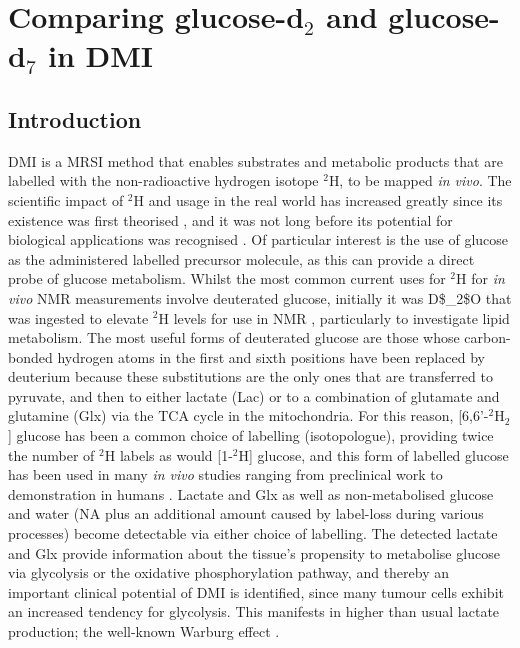\chapter{Comparing \texorpdfstring{glucose-d$_2$}{D2} and \texorpdfstring{glucose-d$_7$}{D7} in DMI}
\label{Chap:Glucose}

\section{Introduction}

\ac{DMI} is a \ac{MRSI} method that enables substrates and metabolic products that are labelled with the non-radioactive hydrogen isotope $^2$H, to be mapped \textit{in vivo}. The scientific impact of $^2$H and usage in the real world has increased greatly since its existence was first theorised \cite{Urey1932AConcentration}, and it was not long before its potential for biological applications was recognised \cite{Schoenheimer1935DeuteriumMetabolism, Schoenheimer1938TheMetabolism}. Of particular interest is the use of glucose as the administered labelled precursor molecule, as this can provide a direct probe of glucose metabolism. Whilst the most common current uses for $^2$H for \textit{in vivo} \ac{NMR} measurements involve deuterated glucose, initially it was \ac{D$_2$O} that was ingested to elevate $^2$H levels for use in \ac{NMR} \cite{Brereton1986PreliminarySpectroscopy, Irving1987InSpectroscopy}, particularly to investigate lipid metabolism. The most useful forms of deuterated glucose are those whose carbon-bonded hydrogen atoms in the first and sixth positions have been replaced by deuterium because these substitutions are the only ones that are transferred to pyruvate, and then to either lactate (Lac) or to a combination of glutamate and glutamine (Glx) via the \ac{TCA} cycle in the mitochondria. For this reason, [6,6'-$^2$H$_2$] glucose has been a common choice of labelling (isotopologue), providing twice the number of $^2$H labels as would [1-$^2$H] glucose, and this form of labelled glucose has been used in many \textit{in vivo} studies ranging from preclinical work \cite{Lu2017QuantitativeSpectroscopy, Meerwaldt2023InImaging} to demonstration in humans  \cite{DeFeyter2018DeuteriumVivo, Roig2022Deuterium7T}. Lactate and Glx as well as non-metabolised glucose and water (\ac{NA} plus an additional amount caused by label-loss during various processes) become detectable via either choice of labelling. The detected lactate and Glx provide information about the tissue’s propensity to metabolise glucose via glycolysis or the oxidative phosphorylation pathway, and thereby an important clinical potential of DMI is identified, since many tumour cells exhibit an increased tendency for glycolysis. This manifests in higher than usual lactate production;  the well-known Warburg effect \cite{Warburg1956OnCells}.    

